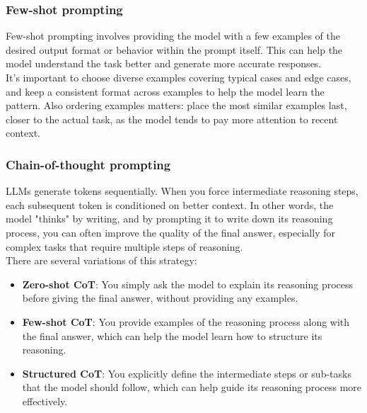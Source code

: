 \subsubsection{Few-shot prompting}
Few-shot prompting involves providing the model with a few examples of the desired output format or behavior within the prompt itself.
This can help the model understand the task better and generate more accurate responses.
\\
It's important to choose diverse examples covering typical cases and edge cases, and keep a consistent format across examples to help the model learn the pattern.
Also ordering examples matters: place the most similar examples last, closer to the actual task, as the model tends to pay more attention to recent context.

\subsubsection{Chain-of-thought prompting}
LLMs generate tokens sequentially.
When you force intermediate reasoning steps, each subsequent token is conditioned on better context.
In other words, the model "thinks" by writing, and by prompting it to write down its reasoning process, you can often improve the quality of the final answer, especially for complex tasks that require multiple steps of reasoning.
\\
There are several variations of this strategy:
\begin{itemize}
    \item \textbf{Zero-shot CoT}: You simply ask the model to explain its reasoning process before giving the final answer, without providing any examples.
    \item \textbf{Few-shot CoT}: You provide examples of the reasoning process along with the final answer, which can help the model learn how to structure its reasoning.
    \item \textbf{Structured CoT}: You explicitly define the intermediate steps or sub-tasks that the model should follow, which can help guide its reasoning process more effectively.
\end{itemize}


